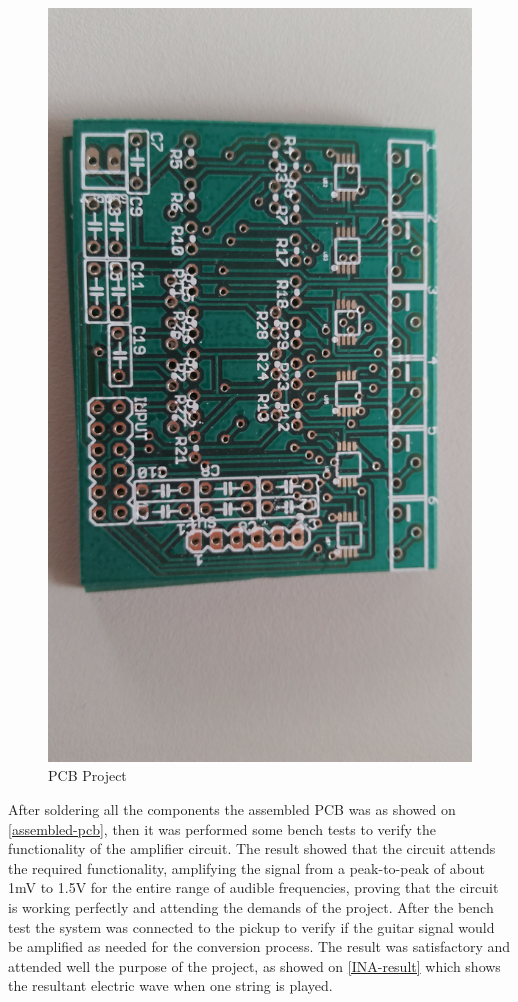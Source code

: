 \begin{figure}[!htpb]
  \centering
  \caption{PCB Project}
  \label{INA-printed}
  \includegraphics[scale=0.07]{images/INA/printed.jpeg}
\end{figure}


After soldering all the components the assembled PCB was as showed on \autoref{assembled-pcb},
then it was performed some bench tests to verify the
functionality of the amplifier circuit. The result showed that the circuit attends
the required functionality, amplifying the signal from a peak-to-peak of about 1mV
to 1.5V for the entire range of audible frequencies, proving that the circuit is
working perfectly and attending the demands of the project. After the bench test
the system was connected to the pickup to verify if the guitar signal would be
amplified as needed for the conversion process. The result was satisfactory and
attended well the purpose of the project, as showed on \autoref{INA-result} which shows
the resultant electric wave when one string is played.


